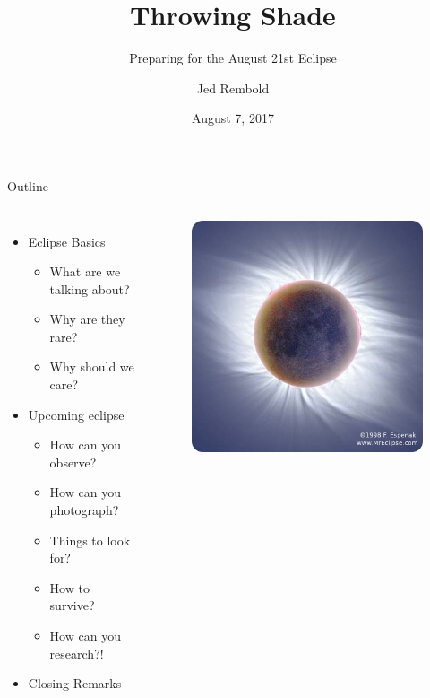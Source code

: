 \documentclass[pdf, aspectratio=169]{beamer}
\title{Throwing Shade}
\subtitle{Preparing for the August 21st Eclipse}
\author{Jed Rembold}
\institute{Willamette University}
\date{August 7, 2017}
\begin{document}
{
  \maketitle
}

\begin{frame}{Outline}
	\begin{columns}
		\begin{itemize}[<+->]
			\item Eclipse Basics
				\begin{itemize}
					\item What are we talking about?
					\item Why are they rare?
					\item Why should we care?
				\end{itemize}
			\item Upcoming eclipse
				\begin{itemize}
					\item How can you observe?
					\item How can you photograph?
					\item Things to look for?
					\item How to survive?
					\item How can you research?!
				\end{itemize}
			\item Closing Remarks
		\end{itemize}	
		\begin{figure}[h!]
			\centering
			\includegraphics[width=0.8\linewidth]{eclipse1.png}
		\end{figure}
		
	\end{columns}
	
	
\end{frame}
\end{document}
